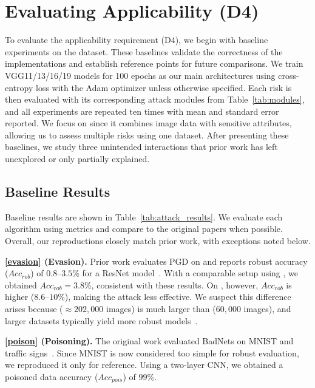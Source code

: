 \section{Evaluating Applicability (D4)}\label{sec:evaluation}


To evaluate the applicability requirement (D4), we begin with baseline experiments on the \celeba dataset.
These baselines validate the correctness of the implementations and establish reference points for future comparisons.
We train VGG11/13/16/19 models for 100 epochs as our main architectures using cross-entropy loss with the Adam optimizer unless otherwise specified.
Each risk is then evaluated with its corresponding attack modules from Table~\ref{tab:modules}, and all experiments are repeated ten times with mean and standard error reported.
We focus on \celeba since it combines image data with sensitive attributes, allowing us to assess multiple risks using one dataset.
After presenting these baselines, we study three unintended interactions that prior work has left unexplored or only partially explained.

\subsection{Baseline Results}
Baseline results are shown in Table~\ref{tab:attack_results}.
We evaluate each algorithm using  metrics and compare to the original papers when possible.
Overall, our reproductions closely match prior work, with exceptions noted below.

\noindent\textbf{\ref{evasion} (Evasion).}
Prior work evaluates PGD on \cifar and reports robust accuracy ($Acc_{rob}$) of $0.8$--$3.5\%$ for a ResNet model~\cite{madry2018DeepLearningModels}.
With a comparable setup using \cifar, we obtained $Acc_{rob}=3.8\%$, consistent with these results.
On \celeba, however, $Acc_{rob}$ is higher ($8.6$--$10\%$), making the attack less effective.
We suspect this difference arises because \celeba ($\approx202{,}000$ images) is much larger than \cifar ($60{,}000$ images), and larger datasets typically yield more robust models~\cite{schmidt2018AdversariallyRobustGeneralization}.

\noindent\textbf{\ref{poison} (Poisoning).}
The original work evaluated BadNets on MNIST and traffic signs~\cite{gu2019BadNetsEvaluatingBackdooring}.
Since MNIST is now considered too simple for robust evaluation, we reproduced it only for reference.
Using a two-layer CNN, we obtained a poisoned data accuracy ($Acc_{pois}$) of $99\%$.


